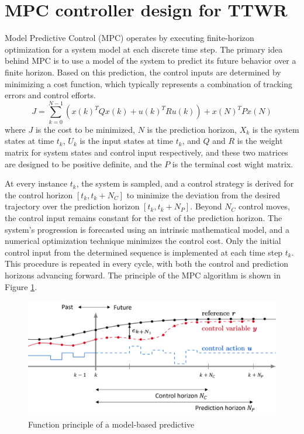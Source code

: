 \section{MPC controller design for TTWR}
\label{MPC controller design for TTWR}
Model Predictive Control (MPC) operates by executing finite-horizon optimization for a system model at each discrete time step. The primary idea behind MPC is to use a model of the system to predict its future behavior over a finite horizon. Based on this prediction, the control inputs are determined by minimizing a cost function, which typically represents a combination of tracking errors and control efforts.
\begin{equation}
J = \sum_{k=0}^{N-1} \left( x(k)^T Q x(k) + u(k)^T R u(k) \right) + x(N)^T P x(N)
\end{equation}
where $J$ is the cost to be minimized, $N$ is the prediction horizon, $X_k$ is the system states at time $t_k$, $U_k$ is the input states at time $t_k$, and $Q$ and $R$ is the weight matrix for system states and control input respectively, and these two matrices are designed to be positive definite, and the $P$ is the terminal cost wight matrix.

At every instance $t_k$, the system is sampled, and a control strategy is derived for the control horizon $[t_k, t_k + N_C]$ to minimize the deviation from the desired trajectory over the prediction horizon $[t_k, t_k + N_P]$. Beyond $N_C$ control moves, the control input remains constant for the rest of the prediction horizon. The system's progression is forecasted using an intrinsic mathematical model, and a numerical optimization technique minimizes the control cost. Only the initial control input from the determined sequence is implemented at each time step $t_k$. This procedure is repeated in every cycle, with both the control and prediction horizons advancing forward. The principle of the MPC algorithm is shown in Figure \ref{fig: Function principle of a model-based predictive}.

\begin{figure}
    \centering
    \includegraphics[width=0.7\linewidth]{fig/mpc/mpc_examples.png}
    \caption{Function principle of a model-based predictive \parencite{schwenzer2021review}}
    \label{fig: Function principle of a model-based predictive}
\end{figure}

